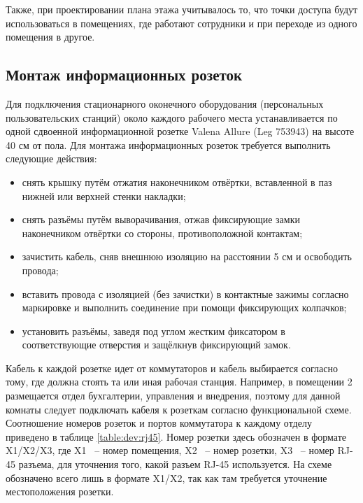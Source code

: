 Также, при проектировании плана этажа учитывалось то, что точки доступа будут использоваться в помещениях, где работают сотрудники
и при переходе из одного помещения в другое.

\subsection{Монтаж информационных розеток}

Для подключения стационарного оконечного оборудования (персональных пользовательских станций) около каждого рабочего места устанавливается 
по одной сдвоенной информационной розетке Valena Allure (Leg 753943) на высоте 40 см от пола. Для монтажа информационных розеток 
требуется выполнить следующие действия:

\begin{itemize}
    \item снять крышку путём отжатия наконечником отвёртки, вставленной в паз нижней или верхней стенки накладки;
    \item снять разъёмы путём выворачивания, отжав фиксирующие замки наконечником отвёртки со стороны, противоположной контактам;
    \item зачистить кабель, сняв внешнюю изоляцию на расстоянии 5 см и освободить провода;
    \item вставить провода с изоляцией (без зачистки) в контактные зажимы согласно маркировке и выполнить соединение при помощи фиксирующих колпачков;
    \item установить разъёмы, заведя под углом жестким фиксатором в соответствующие отверстия и защёлкнув фиксирующий замок.
\end{itemize}

Кабель к каждой розетке идет от коммутаторов и кабель выбирается согласно тому, где должна стоять та или иная рабочая станция.
Например, в помещении 2 размещается отдел бухгалтерии, управления и внедрения, поэтому для данной комнаты следует подключать кабеля к розеткам 
согласно функциональной схеме. Соотношение номеров розеток и портов коммутатора к каждому отделу приведено в таблице \ref{table:dev:rj45}. Номер розетки 
здесь обозначен в формате X1/X2/X3, где X1 ~-- номер помещения, X2 ~-- номер розетки, X3 ~-- номер RJ-45 разъема, для уточнения того,
какой разъем RJ-45 используется. На схеме \floor обозначено всего лишь в формате X1/X2, так как там требуется уточнение местоположения розетки.

